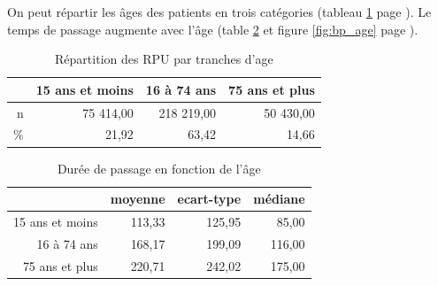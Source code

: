 \documentclass[12pt,english,french,twoside]{book}\usepackage[]{graphicx}\usepackage[]{color}
\begin{document}
On peut répartir les âges des patients en trois catégories (tableau \ref{tab:tranches_age} page \pageref{tab:tranches_age}). Le temps de passage augmente avec l'âge (table \ref{tab:age_dp} et figure \ref{fig:bp_age} page \pageref{fig:bp_age}).


\begin{table}[ht]
\centering
\begin{tabular}{rrrr}
  \hline
 & 15 ans et moins & 16 à 74 ans & 75 ans et plus \\ 
  \hline
n & 75 414,00 & 218 219,00 & 50 430,00 \\ 
  \% & 21,92 & 63,42 & 14,66 \\ 
   \hline
\end{tabular}
\caption[Répartition des RPU par tranches d'age]{Répartition des RPU par tranches d'age } 
\label{tab:tranches_age}
\end{table}



\begin{table}[ht]
\centering
\begin{tabular}{rrrr}
  \hline
 & moyenne & ecart-type & médiane \\ 
  \hline
15 ans et moins & 113,33 & 125,95 & 85,00 \\ 
  16 à 74 ans & 168,17 & 199,09 & 116,00 \\ 
  75 ans et plus & 220,71 & 242,02 & 175,00 \\ 
   \hline
\end{tabular}
\caption[Durée de passage et age]{Durée de passage en fonction de l'âge} 
\label{tab:age_dp}
\end{table}
\end{document}
